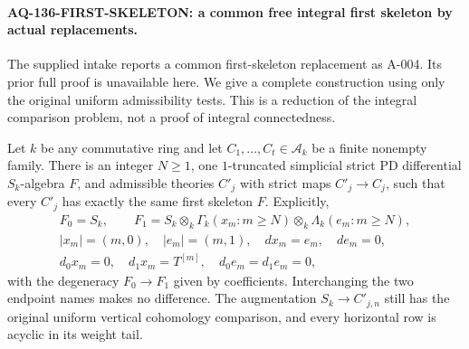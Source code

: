 \paragraph{AQ-136-FIRST-SKELETON: a common free integral first skeleton by actual replacements.}
The supplied intake reports a common first-skeleton replacement
as A-004. Its prior full proof is unavailable here. We give a
complete construction using only the original uniform
admissibility tests. This is a reduction of the integral
comparison problem, not a proof of integral connectedness.

Let $k$ be any commutative ring and let
$C_1,\ldots,C_t\in\mathcal A_k$ be a finite nonempty family.
There is an integer $N\ge1$, one $1$-truncated simplicial strict
PD differential $S_k$-algebra $F$, and admissible theories
$C'_j$ with strict maps $C'_j\to C_j$, such that every $C'_j$
has exactly the same first skeleton $F$. Explicitly,
\[
 \begin{gathered}
 F_0=S_k,\qquad
 F_1=S_k\otimes_k
       \Gamma_k(x_m:m\ge N)\otimes_k\Lambda_k(e_m:m\ge N),\\
 |x_m|=(m,0),\quad |e_m|=(m,1),\quad dx_m=e_m,\quad de_m=0,\\
 d_0x_m=0,\quad d_1x_m=T^{[m]},\quad
 d_0e_m=d_1e_m=0,
 \end{gathered}                                             \tag{136.SK1}
\]
with the degeneracy $F_0\to F_1$ given by coefficients.
Interchanging the two endpoint names makes no difference.
The augmentation $S_k\to C'_{j,n}$ still has the original
uniform vertical cohomology comparison, and every horizontal
row is acyclic in its weight tail.

